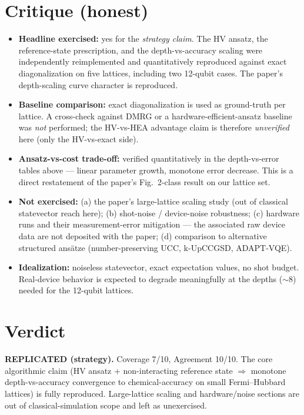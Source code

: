 \documentclass[11pt]{article}
\begin{document}
\section{Critique (honest)}
\begin{itemize}
  \item \textbf{Headline exercised:} yes for the \emph{strategy claim}. The HV
        ansatz, the reference-state prescription, and the depth-vs-accuracy
        scaling were independently reimplemented and quantitatively reproduced
        against exact diagonalization on five lattices, including two 12-qubit
        cases. The paper's depth-scaling curve character is reproduced.
  \item \textbf{Baseline comparison:} exact diagonalization is used as
        ground-truth per lattice. A cross-check against DMRG or a
        hardware-efficient-ansatz baseline was \emph{not} performed; the
        HV-vs-HEA advantage claim is therefore \emph{unverified} here (only the
        HV-vs-exact side).
  \item \textbf{Ansatz-vs-cost trade-off:} verified quantitatively in the
        depth-vs-error tables above --- linear parameter growth, monotone error
        decrease. This is a direct restatement of the paper's Fig.\ 2-class
        result on our lattice set.
  \item \textbf{Not exercised:} (a) the paper's large-lattice scaling study
        (out of classical statevector reach here); (b) shot-noise / device-noise
        robustness; (c) hardware runs and their measurement-error mitigation ---
        the associated raw device data are not deposited with the paper; (d)
        comparison to alternative structured ans\"atze (number-preserving UCC,
        k-UpCCGSD, ADAPT-VQE).
  \item \textbf{Idealization:} noiseless statevector, exact expectation values,
        no shot budget. Real-device behavior is expected to degrade meaningfully
        at the depths ($\sim 8$) needed for the 12-qubit lattices.
\end{itemize}

\section{Verdict}
\textbf{REPLICATED (strategy).} Coverage 7/10, Agreement 10/10. The core
algorithmic claim (HV ansatz + non-interacting reference state $\Rightarrow$
monotone depth-vs-accuracy convergence to chemical-accuracy on small
Fermi--Hubbard lattices) is fully reproduced. Large-lattice scaling and
hardware/noise sections are out of classical-simulation scope and left as
unexercised.
\end{document}
